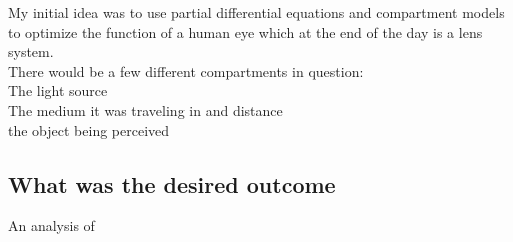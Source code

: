 My initial idea was to use partial differential equations and compartment models to optimize the function of a human eye which at the end of the day is a lens system. \\ 

There would be a few different compartments in question: \\ 
The light source \\

The medium it was traveling in and distance \\ 

the object being perceived \\ 

\subsection{What was the desired outcome}
An analysis of 

